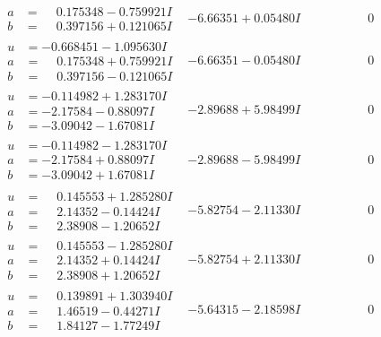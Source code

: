 \documentclass[1p]{elsarticle_modified}
\theoremstyle{definition}
\begin{document}
$$\begin{array}{c|c|c}
\begin{aligned}
a &= \phantom{-}0.175348 - 0.759921 I \\
b &= \phantom{-}0.397156 + 0.121065 I\end{aligned}
 & -6.66351 + 0.05480 I & \phantom{-0.000000 } 0 \\ \hline\begin{aligned}
u &= -0.668451 - 1.095630 I \\
a &= \phantom{-}0.175348 + 0.759921 I \\
b &= \phantom{-}0.397156 - 0.121065 I\end{aligned}
 & -6.66351 - 0.05480 I & \phantom{-0.000000 } 0 \\ \hline\begin{aligned}
u &= -0.114982 + 1.283170 I \\
a &= -2.17584 - 0.88097 I \\
b &= -3.09042 - 1.67081 I\end{aligned}
 & -2.89688 + 5.98499 I & \phantom{-0.000000 } 0 \\ \hline\begin{aligned}
u &= -0.114982 - 1.283170 I \\
a &= -2.17584 + 0.88097 I \\
b &= -3.09042 + 1.67081 I\end{aligned}
 & -2.89688 - 5.98499 I & \phantom{-0.000000 } 0 \\ \hline\begin{aligned}
u &= \phantom{-}0.145553 + 1.285280 I \\
a &= \phantom{-}2.14352 - 0.14424 I \\
b &= \phantom{-}2.38908 - 1.20652 I\end{aligned}
 & -5.82754 - 2.11330 I & \phantom{-0.000000 } 0 \\ \hline\begin{aligned}
u &= \phantom{-}0.145553 - 1.285280 I \\
a &= \phantom{-}2.14352 + 0.14424 I \\
b &= \phantom{-}2.38908 + 1.20652 I\end{aligned}
 & -5.82754 + 2.11330 I & \phantom{-0.000000 } 0 \\ \hline\begin{aligned}
u &= \phantom{-}0.139891 + 1.303940 I \\
a &= \phantom{-}1.46519 - 0.44271 I \\
b &= \phantom{-}1.84127 - 1.77249 I\end{aligned}
 & -5.64315 - 2.18598 I & \phantom{-0.000000 } 0 \\ \hline\begin{aligned}

\end{aligned}
\end{array}$$
\end{document}
